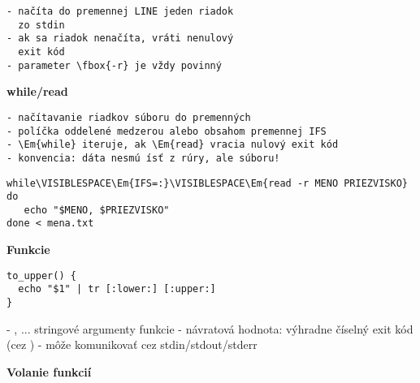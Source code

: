 \documentclass[8pt,landscape]{extarticle}
\newcommand{\Heading}[1]{%
{\begin{center}\bfseries\Large#1\end{center}}%
}%
\newcommand{\Em}[1]{\Ovalbox{\ttfamily #1}}
\def\VISIBLESPACE{{\tiny $\sqcup$}}
\newenvironment{karticka}[1]%
{%
\Heading{#1}%
}%
{%
\clearpage
}%
\begin{document}
%
\begin{Verbatim}[commandchars=\\\{\}]
- načíta do premennej LINE jeden riadok 
  zo stdin
- ak sa riadok nenačíta, vráti nenulový
  exit kód
- parameter \fbox{-r} je vždy povinný
\end{Verbatim}
\newpage
\begin{karticka}{while/read}
\begin{Verbatim}[commandchars=\\\{\}]
- načítavanie riadkov súboru do premenných
- políčka oddelené medzerou alebo obsahom premennej IFS
- \Em{while} iteruje, ak \Em{read} vracia nulový exit kód
- konvencia: dáta nesmú ísť z rúry, ale súboru!
\end{Verbatim}
%
\begin{middlecolorbox}
\begin{Verbatim}[commandchars=\\\{\}]
while\VISIBLESPACE\Em{IFS=:}\VISIBLESPACE\Em{read -r MENO PRIEZVISKO}
do
   echo "$MENO, $PRIEZVISKO"
done < mena.txt
\end{Verbatim}
\end{middlecolorbox}
\end{karticka}
\begin{karticka}{Funkcie}
\begin{middlecolorbox}
\begin{Verbatim}
to_upper() {
  echo "$1" | tr [:lower:] [:upper:]
}
\end{Verbatim}
\end{middlecolorbox}
\begin{obsah}
- \Em{$1}, \Em{$2}... stringové argumenty funkcie
- návratová hodnota: výhradne číselný exit kód 
  (cez \Em{return})
- môže komunikovať cez stdin/stdout/stderr
\end{obsah}
\end{karticka}

\begin{karticka}{Volanie funkcií}
\end{karticka}
\end{document}
